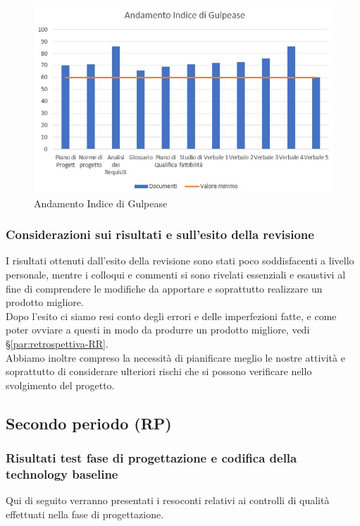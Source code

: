\documentclass[../piano_di_qualifica.tex]{subfiles}
\begin{document}
\begin{figure}[H]
	\centering
	\includegraphics[width=12cm]{img/media_gul.jpg}
	\caption{ Andamento Indice di Gulpease}
\end{figure}

\subsubsection{Considerazioni sui risultati e sull’esito della revisione }
I risultati ottenuti dall’esito della revisione sono stati poco soddisfacenti a livello personale, mentre i colloqui e commenti si sono rivelati essenziali e esaustivi al fine di comprendere le modifiche da apportare e soprattutto realizzare un prodotto migliore. \\
Dopo l'esito ci siamo resi conto degli errori e delle imperfezioni fatte, e come poter ovviare a questi in modo da produrre un prodotto migliore, vedi \S\ref{par:retrospettiva-RR}. \\
Abbiamo inoltre compreso la necessità di pianificare meglio le nostre attività e soprattutto di considerare ulteriori rischi che si possono verificare nello svolgimento del progetto.


\subsection{Secondo periodo (RP)}
\label{sub:periodo-RP}
\subsubsection{Risultati test fase di progettazione e codifica della technology baseline}
Qui di seguito verranno presentati i resoconti relativi ai controlli di qualità effettuati nella fase di progettazione. \par
\end{document}

